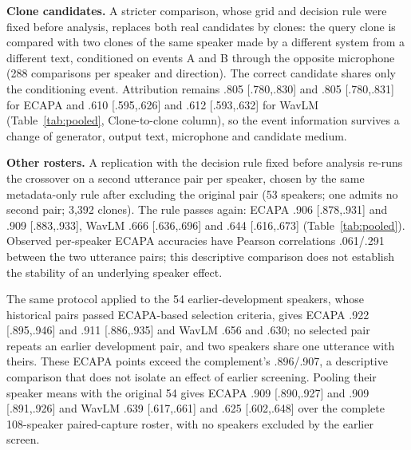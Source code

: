 \documentclass[10pt,twocolumn,letterpaper]{article}
\begin{document}
\textbf{Clone candidates.} A stricter comparison, whose grid and decision rule
were fixed before analysis, replaces both real candidates by clones: the query
clone is compared with two clones of the same speaker made by a different
system from a different text, conditioned on events A and B through the
opposite microphone (288 comparisons per speaker and direction). The correct
candidate shares only the conditioning event. Attribution remains .805
[.780,.830] and .805 [.780,.831] for ECAPA and .610 [.595,.626] and .612
[.593,.632] for WavLM (Table~\ref{tab:pooled}, Clone-to-clone column), so the event
information survives a change of generator, output text, microphone and
candidate medium.

\textbf{Other rosters.} A replication with the decision rule fixed before
analysis re-runs the crossover on a second utterance pair per speaker, chosen
by the same metadata-only rule after excluding the original pair (53 speakers;
one admits no second pair; 3,392 clones). The rule passes again: ECAPA .906
[.878,.931] and .909 [.883,.933], WavLM .666 [.636,.696] and .644 [.616,.673]
(Table~\ref{tab:pooled}). Observed per-speaker ECAPA accuracies have Pearson
correlations .061/.291 between the two utterance pairs; this descriptive
comparison does not establish the stability of an underlying speaker effect.

The same protocol applied to the 54 earlier-development
speakers, whose historical pairs passed ECAPA-based selection criteria, gives
ECAPA .922 [.895,.946] and .911 [.886,.935] and WavLM .656 and .630; no
selected pair repeats an earlier development pair, and two speakers share one
utterance with theirs. These ECAPA points exceed the complement's .896/.907, a
descriptive comparison that does not isolate an effect of earlier screening.
Pooling their speaker means with the original 54 gives ECAPA
.909 [.890,.927] and .909 [.891,.926] and WavLM .639 [.617,.661] and .625
[.602,.648] over the complete 108-speaker paired-capture roster, with no
speakers excluded by the earlier screen.
\end{document}
